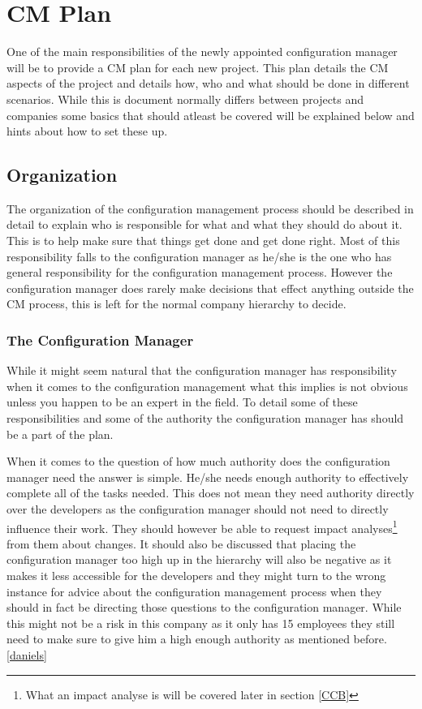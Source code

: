 \documentclass[a4paper]{article}
\begin{document}
\section{CM Plan}
One of the main responsibilities of the newly appointed configuration manager will be to provide a CM plan for each new project. This plan details the CM aspects of the project and details how, who and what should be done in different scenarios. While this is document normally differs between projects and companies some basics that should atleast be covered will be explained below and hints about how to set these up. 

\subsection{Organization}
The organization of the configuration management process should be described in detail to explain who is responsible for what and what they should do about it. This is to help make sure that things get done and get done right. Most of this responsibility falls to the configuration manager as he/she is the one who has general responsibility for the configuration management process. However the configuration manager does rarely make decisions that effect anything outside the CM process, this is left for the normal company hierarchy to decide.

\subsubsection{The Configuration Manager}
While it might seem natural that the configuration manager has responsibility when it comes to the configuration management what this implies is not obvious unless you happen to be an expert in the field. To detail some of these responsibilities and some of the authority the configuration manager has should be a part of the plan.

When it comes to the question of how much authority does the configuration manager need the answer is simple. He/she needs enough authority to effectively complete all of the tasks needed. This does not mean they need authority directly over the developers as the configuration manager should not need to directly influence their work. They should however be able to request impact analyses\footnote{What an impact analyse is will be covered later in section \ref{CCB}} from them about changes. It should also be discussed that placing the configuration manager too high up in the hierarchy will also be negative as it makes it less accessible for the developers and they might turn to the wrong instance for advice about the configuration management process when they should in fact be directing those questions to the configuration manager. While this might not be a risk in this company as it only has 15 employees they still need to make sure to give him a high enough authority as mentioned before.\ref{daniels}
\end{document}
